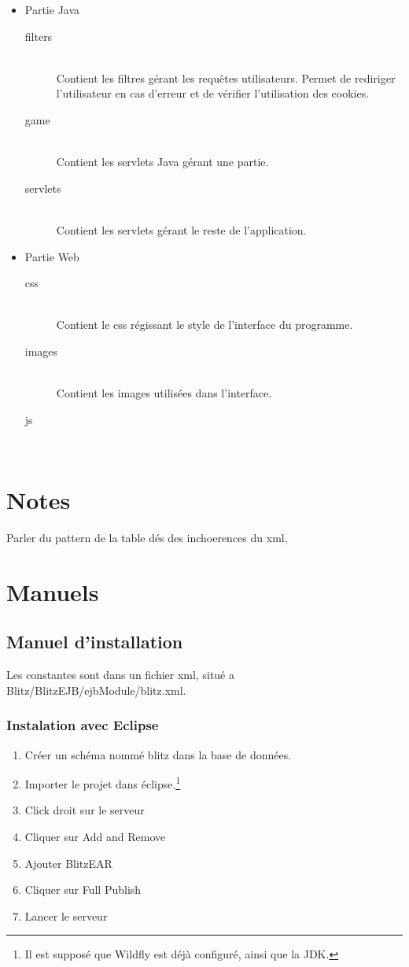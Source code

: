 \documentclass[11pt]{scrreprt}
\begin{document}
    \begin{itemize}
        \item Partie Java
        \begin{description}
            \item[filters]\hfill \\ Contient les filtres gérant les requêtes utilisateurs. Permet de rediriger l'utilisateur en cas d'erreur et de vérifier l'utilisation des cookies.
            \item[game]\hfill \\ Contient les servlets Java gérant une partie.
            \item[servlets]\hfill \\ Contient les servlets gérant le reste de l'application.
        \end{description}
        \item Partie Web
        \begin{description}
            \item[css]\hfill \\ Contient le css régissant le style de l'interface du programme.
            \item[images]\hfill \\ Contient les images utilisées dans l'interface.
            \item[js]\hfill \\
        \end{description}
    \end{itemize}
    \chapter{Notes}
    Parler du pattern
    de la table dés
    des inchoerences du xml,

    \chapter{Manuels}
    \section{Manuel d'installation}
    Les constantes sont dans un fichier xml, situé a Blitz/BlitzEJB/ejbModule/blitz.xml.

    \subsection{Instalation avec Eclipse}
    \begin{enumerate}
        \item Créer un schéma nommé \og blitz\fg{} dans la base de données.
        \item Importer le projet dans éclipse.\footnote{Il est supposé que Wildfly est déjà configuré, ainsi que la JDK.}
        \item Click droit sur le serveur
        \item Cliquer sur \og Add and Remove\fg{}
        \item Ajouter \og BlitzEAR\fg{}
        \item Cliquer sur \og Full Publish\fg{}
        \item Lancer le serveur
    \end{enumerate}
\end{document}
